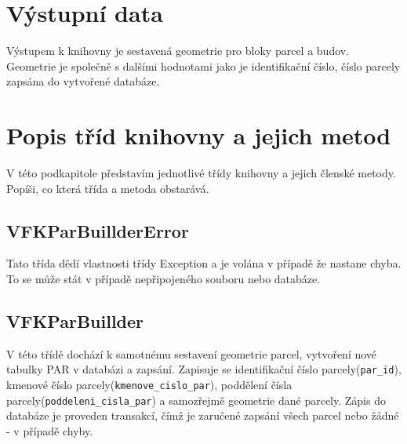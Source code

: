 \section{Výstupní data}
Výstupem k knihovny je sestavená geometrie pro bloky parcel a budov. Geometrie je společně s dalšími hodnotami jako je identifikační číslo, číslo parcely zapsána do vytvořené databáze.
\section{Popis tříd knihovny a jejich metod}
V této podkapitole představím jednotlivé třídy knihovny a jejich členské metody. Popíši, co která třída a metoda obstarává.
\subsection{VFKParBuillderError}
Tato třída dědí vlastnosti třídy Exception a je volána v případě že nastane chyba. To se může stát v případě nepřipojeného  souboru nebo databáze.
\subsection{VFKParBuillder}
V této třídě dochází k samotnému sestavení geometrie parcel, vytvoření nové tabulky PAR v databázi a zapsání. Zapisuje se identifikační číslo parcely(\verb|par_id|), kmenové číslo parcely(\verb|kmenove_cislo_par|), poddělení čísla parcely(\verb|poddeleni_cisla_par|) a samozřejmě geometrie dané parcely. Zápis do databáze je proveden transakcí, čímž je zaručené zapsání všech parcel nebo žádné - v případě chyby.

